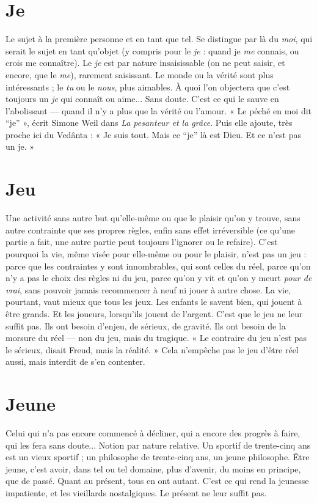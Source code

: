 {\section{Je}
Le sujet à la première personne et en tant que tel. Se distingue par là du
{\it moi}, qui serait le sujet en tant qu’objet (y compris pour le {\it je} : quand je
{\it me} connais, ou crois me connaître). Le {\it je} est par nature insaisissable (on ne
peut saisir, et encore, que le {\it me}), rarement saisissant. Le monde ou la vérité
sont plus intéressants ; le {\it tu} ou le {\it nous}, plus aimables. À quoi l’on objectera que
c'est toujours un {\it je} qui connaît ou aime... Sans doute. C’est ce qui le sauve en
l’abolissant — quand il n’y a plus que la vérité ou l'amour. « Le péché en moi dit
“je” », écrit Simone Weil dans {\it La pesanteur et la grâce}. Puis elle ajoute, très
proche ici du Vedânta : « Je suis tout. Mais ce “je” là est Dieu. Et ce n’est pas
un je. »

\section{Jeu}
Une activité sans autre but qu’elle-même ou que le plaisir qu'on y
trouve, sans autre contrainte que ses propres règles, enfin sans effet irréversible
(ce qu’une partie a fait, une autre partie peut toujours l’ignorer ou le
refaire). C’est pourquoi la vie, même visée pour elle-même ou pour le plaisir,
n’est pas un jeu : parce que les contraintes y sont innombrables, qui sont celles
du réel, parce qu’on n’y a pas le choix des règles ni du jeu, parce qu’on y vit et
qu’on y meurt {\it pour de vrai}, sans pouvoir jamais recommencer à neuf ni jouer à
autre chose. La vie, pourtant, vaut mieux que tous les jeux. Les enfants le savent
bien, qui jouent à être grands. Et les joueurs, lorsqu'ils jouent de l'argent. C'est
que le jeu ne leur suffit pas. Ils ont besoin d’enjeu, de sérieux, de gravité. Ils ont
besoin de la morsure du réel — non du jeu, mais du tragique. « Le contraire du
jeu n’est pas le sérieux, disait Freud, mais la réalité. » Cela n'empêche pas le jeu
d’être réel aussi, mais interdit de s’en contenter.

\section{Jeune}
Celui qui n’a pas encore commencé à décliner, qui a encore des progrès
à faire, qui les fera sans doute... Notion par nature relative. Un
sportif de trente-cinq ans est un vieux sportif ; un philosophe de trente-cinq
ans, un jeune philosophe. Être jeune, c’est avoir, dans tel ou tel domaine, plus
d'avenir, du moins en principe, que de passé. Quant au présent, tous en ont
autant. C’est ce qui rend la jeunesse impatiente, et les vieillards nostalgiques. Le
présent ne leur suffit pas.

}
